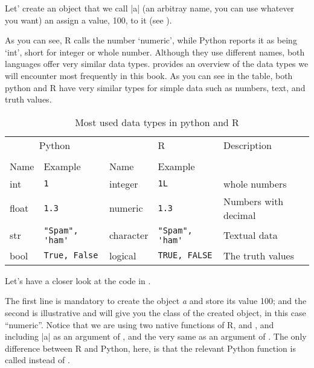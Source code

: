 Let' create an object that we call |a| (an arbitray name, you can use
whatever you want) an assign a value, 100, to it (see ).


As you can see, R calls the number `numeric', while Python reports it
as being `int', short for integer or whole number.  Although they use
different names, both languages offer very similar data types.
 provides an overview of the data types we will
encounter most frequently in this book.  As you can see in the table,
both python and R have very similar types for simple data such as
numbers, text, and truth values.

\newcommand{\fndouble}{In R, double and numeric can generally be used
  interchangably (there is a subtle difference, but that is not
  relevant here).}

\begin{table}
  \caption{\label{tab:types}Most used data types in python and R}{
  \begin{tabularx}{\textwidth}{lllll}
    \toprule
    \multicolumn{2}{c}{Python} & \multicolumn{2}{c}{R}& Description \\
    \cmidrule(lr){1-2}    \cmidrule(lr){3-4}\\
    Name & Example & Name & Example \\
    \midrule
    int   & \verb+1+             & integer   & \verb+1L+             & whole numbers \\
    float & \verb+1.3+           & numeric   & \verb+1.3+           & Numbers with decimal \\
    str   & \verb+"Spam", 'ham'+ & character & \verb+"Spam", 'ham'+ & Textual data  \\ 
    bool  & \verb+True, False+   & logical   & \verb+TRUE, FALSE+   & The truth values \\
    \bottomrule
  \end{tabularx}}{}
\end{table}
    


Let's have a closer look at the code in .

The first line is mandatory to create the object \emph{a} and store
its value 100; and the second is illustrative and will give you the
class of the created object, in this case ``numeric''. Notice that we
are using two native functions of R,  and , and
including |a| as an argument of , and the very same
 as an argument of . The only difference
between R and Python, here, is that the relevant Python function is
called  instead of .

